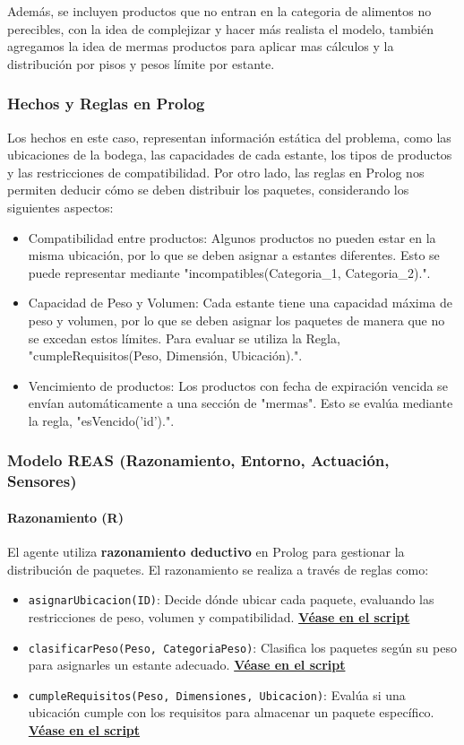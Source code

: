 \documentclass[12pt]{article}
\begin{document}
Además, se incluyen productos que no entran en la categoria de alimentos no perecibles, con la idea de complejizar y hacer más realista el modelo, también agregamos la idea de mermas productos para aplicar mas cálculos y la distribución por pisos y pesos límite por estante.\\

\subsubsection{Hechos y Reglas en Prolog}

Los hechos en este caso, representan información estática del problema, como las ubicaciones de la bodega, las capacidades de cada estante, los tipos de productos y las restricciones de compatibilidad. 
Por otro lado, las reglas en Prolog nos permiten deducir cómo se deben distribuir los paquetes, considerando los siguientes aspectos:
\begin{itemize}
    \item Compatibilidad entre productos: Algunos productos no pueden estar en la misma ubicación, por lo que se deben asignar a estantes diferentes. 
    Esto se puede representar mediante "incompatibles(Categoria\_1, Categoria\_2).".
    \item Capacidad de Peso y Volumen: Cada estante tiene una capacidad máxima de peso y volumen, por lo que se deben asignar los paquetes de manera que no se excedan estos límites.
    Para evaluar se utiliza la Regla, "cumpleRequisitos(Peso, Dimensión, Ubicación).".
    \item Vencimiento de productos:  Los productos con fecha de expiración vencida se envían automáticamente a una sección de "mermas".
    Esto se evalúa mediante la regla, "esVencido('id').".
\end{itemize}
\newpage
\subsubsection{Modelo REAS (Razonamiento, Entorno, Actuación, Sensores)}

\paragraph{Razonamiento (R)}
El agente utiliza \textbf{razonamiento deductivo} en Prolog para gestionar la distribución de paquetes. El razonamiento se realiza a través de reglas como:
\begin{itemize}
    \item \texttt{asignarUbicacion(ID)}: Decide dónde ubicar cada paquete, evaluando las restricciones de peso, volumen y compatibilidad. \hyperref[lst:asignarUbicacion]{ \textbf{Véase en el script}}
    \item \texttt{clasificarPeso(Peso, CategoriaPeso)}: Clasifica los paquetes según su peso para asignarles un estante adecuado.
    \hyperref[lst:clasificarPeso]{ \textbf{Véase en el script}}
    \item \texttt{cumpleRequisitos(Peso, Dimensiones, Ubicacion)}: Evalúa si una ubicación cumple con los requisitos para almacenar un paquete específico.
    \hyperref[lst:cumpleRequisitos]{ \textbf{Véase en el script}}
\end{itemize}
\end{document}
